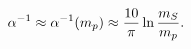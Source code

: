 \begin{equation}
 \alpha^{-1} \approx \alpha^{-1}(m_p)
             \approx {10\over\pi}\ln{m_S\over m_p}.
 \label{eq:15}
 \end{equation}

